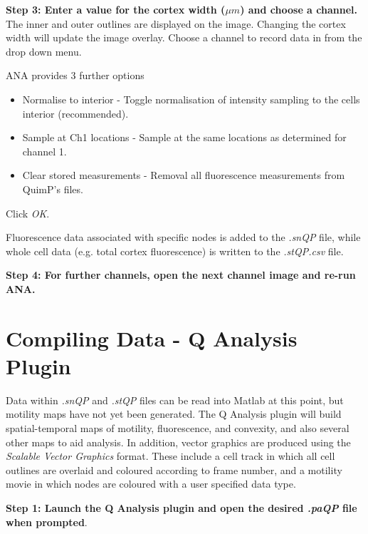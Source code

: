 \documentclass[a4paper,12pt]{article}
\begin{document}
\textbf{Step 3: Enter a value for the cortex width ($\mu m$) and choose a channel.}  The inner and outer outlines
are displayed on the image.  Changing the cortex width will update the image overlay.
Choose a channel to record data in from the drop down menu.

ANA provides 3 further options
\begin{itemize}
	\item Normalise to interior - Toggle normalisation of intensity sampling to the cells interior (recommended).
	\item Sample at Ch1 locations - Sample at the same locations as determined for channel 1.
	\item Clear stored measurements - Removal all fluorescence measurements from QuimP's files.
\end{itemize}

Click \textit{OK}.
  
Fluorescence data associated with specific nodes is added to the \textit{.snQP} 
file, while whole cell data (e.g. total cortex fluorescence) is written to the \textit{.stQP.csv} file.

\textbf{Step 4: For further channels, open the next channel image and re-run ANA.}

\section{Compiling Data - Q Analysis Plugin}

Data within \textit{.snQP} and \textit{.stQP} files can be read into Matlab at this point, but motility maps have not yet been generated.
The Q Analysis plugin will build spatial-temporal maps of motility, fluorescence, and convexity,
and also several other maps to aid analysis.  In addition, vector graphics are produced 
using the \textit{Scalable Vector Graphics} format.  These include a cell track in which all cell outlines are overlaid and coloured
according to frame number, and a motility movie in which nodes are coloured with a user specified data type.

\textbf{Step 1: Launch the Q Analysis plugin and open the desired \textit{.paQP} file when prompted}.
\end{document}
